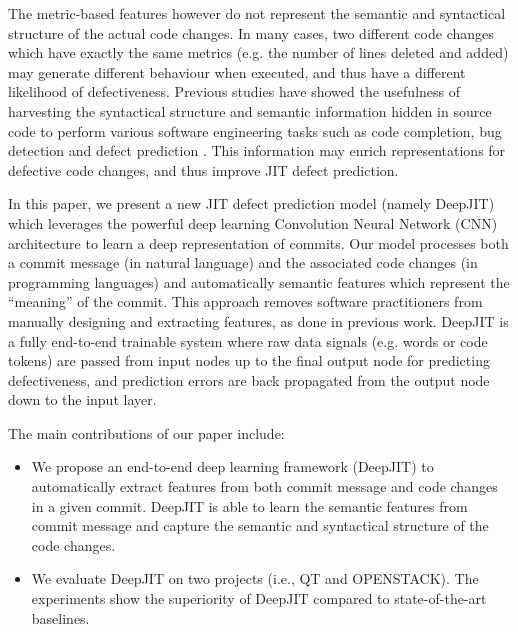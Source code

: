 The metric-based features however do not represent the semantic and syntactical structure of the actual code changes. In many cases, two different code changes which have exactly the same metrics (e.g. the number of lines deleted and added) may generate different behaviour when executed, and thus have a different likelihood of defectiveness. Previous studies have showed the usefulness of harvesting the syntactical structure and semantic information hidden in source code to perform various software engineering tasks such as code completion, bug detection and defect prediction \cite{Wang:2016:ALS,Tu:2014:LS,Nguyen:2015:GSL,Hindle:2012:NS,Li:2005:PAE}. This information may enrich representations for defective code changes, and thus improve JIT defect prediction.

In this paper, we present a new JIT defect prediction model (namely DeepJIT) which leverages the powerful deep learning Convolution Neural Network (CNN) architecture to learn a deep representation of commits. Our model processes both a commit message (in natural language) and the associated code changes (in programming languages) and automatically semantic features which represent the ``meaning'' of the commit. This approach removes software practitioners from manually designing and extracting features, as done in previous work. DeepJIT is a fully end-to-end trainable system where raw data signals (e.g. words or code tokens) are passed from input nodes up to the final output node for predicting defectiveness, and prediction errors are back propagated from the output node down to the input layer.

The main contributions of our paper include:
\begin{itemize}
    \item We propose an end-to-end deep learning framework (DeepJIT) to automatically extract features from both commit message and code changes in a given commit. DeepJIT is able to learn the semantic features from commit message and capture the semantic and syntactical structure of the code changes. 
    \item We evaluate DeepJIT on two projects (i.e., QT and OPENSTACK). The  experiments show  the  superiority of DeepJIT compared to state-of-the-art baselines.
\end{itemize}
